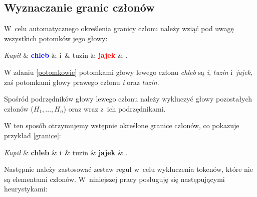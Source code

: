 \subsection{Wyznaczanie granic członów} \label{heurystyki}

W~celu automatycznego określenia granicy członu należy wziąć pod uwagę wszystkich potomków jego głowy:

\begin{exe}
\ex \label{potomkowie}
\begin{dependency}[baseline=-\the\dimexpr\fontdimen22\textfont2\relax]
\begin{deptext}[column sep=1em, row sep=.1ex]
\emph{Kupił} \& \textbf{\textcolor{blue}{chleb}} \& i~\& tuzin \& \textbf{\textcolor{red}{jajek}} \& .  \\ 
\end{deptext}
\end{dependency}
\end{exe}

W zdaniu \eqref{potomkowie} potomkami głowy lewego członu \textit{chleb} są \textit{i}, \textit{tuzin} i~\textit{jajek}, zaś potomkami głowy prawego członu \textit{i} oraz \textit{tuzin}.

Spośród podrzędników głowy lewego członu należy wykluczyć głowy pozostałych członów ($H_{1}, \ldots , H_{n}$) oraz wraz z~ich podrzędnikami.

W ten sposób otrzymujemy wstępnie określone granice członów, co pokazuje przykład \eqref{granice}:

\begin{exe}
\ex \label{granice}
\begin{dependency}[baseline=-\the\dimexpr\fontdimen22\textfont2\relax]
\begin{deptext}[column sep=1em, row sep=.1ex]
\emph{Kupił} \& \textbf{chleb} \& i~\& tuzin \& \textbf{jajek} \& .  \\ 
\end{deptext}
\end{dependency}
\end{exe}

Następnie należy zastosować zestaw reguł w~celu wykluczenia tokenów, które nie są elementami członów. W~niniejszej pracy posługuję się następującymi heurystykami:

